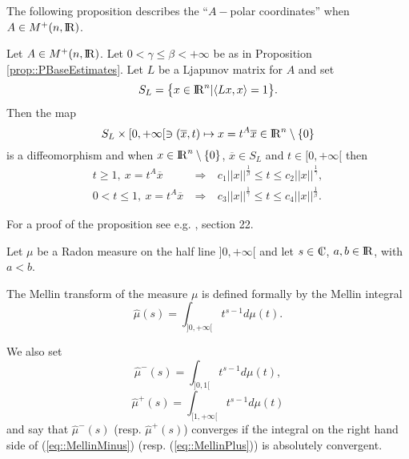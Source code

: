 \documentclass[12pt,a4paper]{amsart}
\begin{document}
The following proposition describes the ``${A}-$polar coordinates''
when ${A}\in{{{M}^+}({n},{{\rm I\kern-.185em R}})}$.

\begin{proposition}\label{prop::PolarDecomposition}
Let ${A}\in{{{M}^+}({n},{{\rm I\kern-.185em R}})}$.
Let $0<{\gamma}\leq{\beta}<+\infty$ be as in Proposition \ref{prop::PBaseEstimates}.
Let ${L}$ be a
Ljapunov matrix for ${A}$
and set
$$
	{S_{L}}=\bigl\{{x}\in{{\rm I\kern-.185em R}}^{n}\vert{\left<{{L}{x}},{{x}}\right>}=1\bigr\}.
$$
Then the map
$$
	S_{L}\times[0,+\infty[\ni({\overline{x}},{t})\mapsto
	{x}={t}^{A}{\overline{x}}\in{{\rm I\kern-.185em R}}^{n}\setminus\{0\}
$$
is a diffeomorphism and when ${x}\in{{\rm I\kern-.185em R}}^{n}\setminus\{0\}$,
${\overline{x}}\in S_{L}$ and
${t}\in[0,+\infty[$ then
\begin{eqnarray}
\label{eq::PolarA}
{t}\geq1,\ {x}={t}^{A}{\overline{x}}&\ \Longrightarrow\ &
{c}_1{\left|\!\left|{x}\right|\!\right|}^{\frac{1}{\beta}}\leq{t}\leq
{c}_2{\left|\!\left|{x}\right|\!\right|}^{\frac{1}{\gamma}},\\
\label{eq::PolarB}
0<{t}\leq1,\ {x}={t}^{A}{\overline{x}}&\ \Longrightarrow\ &
{c}_3{\left|\!\left|{x}\right|\!\right|}^{\frac{1}{\gamma}}\leq{t}\leq
{c}_4{\left|\!\left|{x}\right|\!\right|}^{\frac{1}{\beta}}.
\end{eqnarray}
\end{proposition}

For a proof of the proposition see e.g.
\cite{book:ArnoldOrdDiffEqSpringer}, section 22.

Let ${\mu}$ be a Radon measure on the half line $]0,+\infty[$
and let ${s}\in{{\rm\kern.37em\vrule height1.4ex width.05em depth-.011em\kern-.37em C}}$, $a,b\in{{\rm I\kern-.185em R}}$, with $a<b$.

The Mellin transform of the measure ${\mu}$ is defined formally by
the Mellin integral
\begin{equation}\nonumber
	\hat{\mu}({s})=
	\int_{]0,+\infty[}{t}^{{s}-1}d{\mu}({t}).
\end{equation}

We also set
\begin{equation}\label{eq::MellinMinus}
	\hat{\mu}^-({s})=
	\int_{]0,1[}{t}^{{s}-1}d{\mu}({t}),
\end{equation}
\begin{equation}\label{eq::MellinPlus}
	\hat{\mu}^+({s})=
	\int_{[1,+\infty[}{t}^{{s}-1}d{\mu}({t})
\end{equation}
and say that
$\hat{\mu}^-({s})$ (resp. $\hat{\mu}^+({s})$)
converges if the integral on the right hand side of
(\ref{eq::MellinMinus}) (resp. (\ref{eq::MellinPlus}))
is absolutely convergent.
\end{document}
